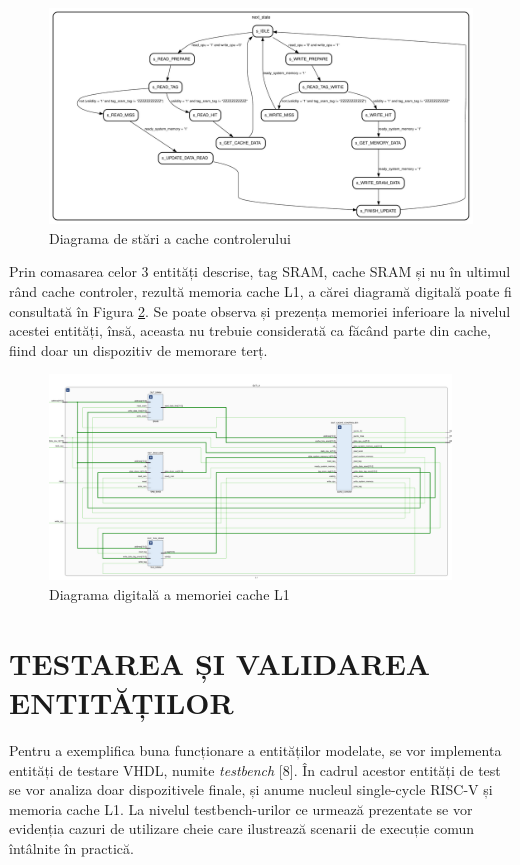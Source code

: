 \documentclass[12pt]{article}
\begin{document}
\newpage
  \begin{figure}[h!]
 \hspace*{-0.20cm}\includegraphics[width=1\textwidth]{cachefsm_0.pdf}
 \centering
 \caption{Diagrama de stări a cache controlerului}
 \label{Figura:63}
 \end{figure}
 
Prin comasarea celor 3 entități descrise, tag SRAM, cache SRAM și nu în ultimul rând cache controler, rezultă memoria cache L1, a cărei diagramă digitală poate fi consultată în Figura \ref{Figura:64}. Se poate observa și prezența memoriei inferioare la nivelul acestei entități, însă, aceasta nu trebuie considerată ca făcând parte din cache, fiind doar un dispozitiv de memorare terț.

  \begin{figure}[h!]
 \hspace*{-0.2cm}\includegraphics[width=0.95\textwidth]{cachel1.png}
 \centering
 \caption{Diagrama digitală a memoriei cache L1}
 \label{Figura:64}
 \end{figure}


\section{\centering TESTAREA ȘI VALIDAREA ENTITĂȚILOR} 
Pentru a exemplifica buna funcționare a entităților modelate, se vor implementa entități de testare VHDL, numite \textit{testbench} [8]. În cadrul acestor entități de test se vor analiza doar dispozitivele finale, și anume nucleul single-cycle RISC-V și memoria cache L1. 
La nivelul testbench-urilor ce urmează prezentate se vor evidenția cazuri de utilizare cheie care ilustrează scenarii de execuție comun întâlnite în practică.
\end{document}
